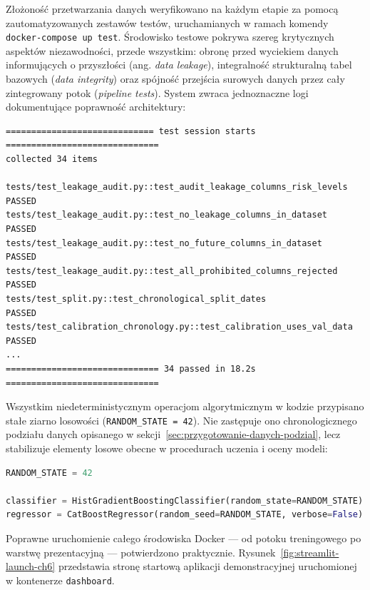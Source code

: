 Złożoność przetwarzania danych weryfikowano na każdym etapie za pomocą zautomatyzowanych zestawów testów, uruchamianych w ramach komendy \texttt{docker-compose up test}. Środowisko testowe pokrywa szereg krytycznych aspektów niezawodności, przede wszystkim: obronę przed wyciekiem danych informujących o przyszłości (ang. \emph{data leakage}), integralność strukturalną tabel bazowych (\emph{data integrity}) oraz spójność przejścia surowych danych przez cały zintegrowany potok (\emph{pipeline tests}). System zwraca jednoznaczne logi dokumentujące poprawność architektury:

\begin{lstlisting}[caption={Fragment wydruku środowiska testowego dokumentujący pomyślne zakończenie audytu wycieku danych (leakage audit)},label={lst:test-output-leakage-audit}]
============================= test session starts ==============================
collected 34 items

tests/test_leakage_audit.py::test_audit_leakage_columns_risk_levels  PASSED
tests/test_leakage_audit.py::test_no_leakage_columns_in_dataset      PASSED
tests/test_leakage_audit.py::test_no_future_columns_in_dataset       PASSED
tests/test_leakage_audit.py::test_all_prohibited_columns_rejected    PASSED
tests/test_split.py::test_chronological_split_dates                  PASSED
tests/test_calibration_chronology.py::test_calibration_uses_val_data PASSED
...
============================== 34 passed in 18.2s ==============================
\end{lstlisting}

Wszystkim niedeterministycznym operacjom algorytmicznym w kodzie przypisano stałe ziarno losowości (\texttt{RANDOM\_STATE = 42}). Nie zastępuje ono chronologicznego podziału danych opisanego w sekcji~\ref{sec:przygotowanie-danych-podzial}, lecz stabilizuje elementy losowe obecne w procedurach uczenia i oceny modeli:

\begin{lstlisting}[language=Python,caption={Przykład utrzymania stałego ziarna losowości w modelowaniu},label={lst:random-state-example}]
RANDOM_STATE = 42

classifier = HistGradientBoostingClassifier(random_state=RANDOM_STATE)
regressor = CatBoostRegressor(random_seed=RANDOM_STATE, verbose=False)
\end{lstlisting}

Poprawne uruchomienie całego środowiska Docker --- od potoku treningowego po warstwę prezentacyjną --- potwierdzono praktycznie. Rysunek~\ref{fig:streamlit-launch-ch6} przedstawia stronę startową aplikacji demonstracyjnej uruchomionej w kontenerze \texttt{dashboard}.

